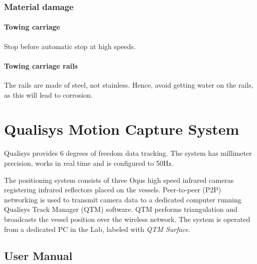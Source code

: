 \documentclass[a4paper,english]{report}
\begin{document}
\subsubsection{Material damage}
\paragraph{Towing carriage}
Stop before automatic stop at high speeds.
\paragraph{Towing carriage rails}
The rails are made of steel, not stainless. Hence, avoid getting water on the rails, as this will lead to corrosion. 

\clearpage{}

\section{Qualisys Motion Capture System}
Qualisys provides 6 degrees of freedom data tracking. The system has millimeter precision, works in real time and is configured to 50Hz.

The positioning system consists of three Oqus high speed infrared cameras registering infrared reflectors placed on the vessels. Peer-to-peer (P2P) networking is used to transmit camera data to a dedicated computer running Qualisys Track Manager (QTM) software. QTM performs triangulation and broadcasts the vessel position over the wireless network. The system is operated from a dedicated PC in the Lab, labeled with \textit{QTM Surface}. 

\subsection{User Manual}
\end{document}
